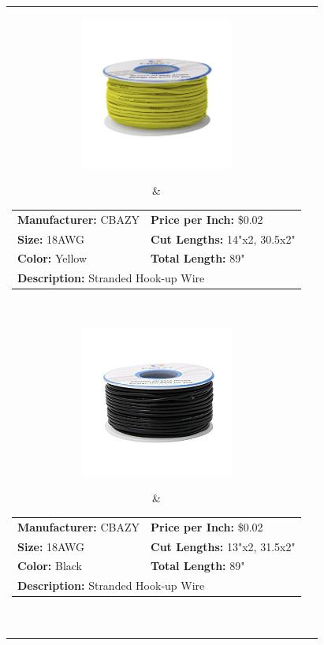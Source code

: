 \documentclass[12pt,letterpaper]{article}
\begin{document}
\begin{longtable}{c l}
\parbox[c]{5cm}{\includegraphics[width=5cm]{yellowire.jpg} }
& \begin{tabular}{l l}
\textbf{Manufacturer:} CBAZY & \textbf{Price per Inch:} \$0.02 \\
\textbf{Size:} 18AWG & \textbf{Cut Lengths:} 14"x2, 30.5x2" \\
\textbf{Color:} Yellow  & \textbf{Total Length:} 89" \\
\multicolumn{2}{p{8cm}}{\textbf{Description:} Stranded Hook-up Wire } \\
\end{tabular} \\

\parbox[c]{5cm}{\includegraphics[width=5cm]{blackwire.jpg} }
& \begin{tabular}{l l}
\textbf{Manufacturer:} CBAZY & \textbf{Price per Inch:} \$0.02 \\
\textbf{Size:} 18AWG & \textbf{Cut Lengths:} 13"x2, 31.5x2" \\
\textbf{Color:} Black  & \textbf{Total Length:} 89" \\
\multicolumn{2}{p{8cm}}{\textbf{Description:} Stranded Hook-up Wire} \\
\end{tabular} \\


\end{longtable}
\end{document}
